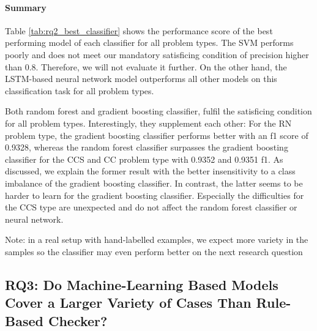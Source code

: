 \paragraph{Summary}

 Table \ref{tab:rq2_best_classifier} shows the performance score of the best performing model of each classifier for all problem types.
 The SVM performs poorly and does not meet our mandatory satisficing condition of precision higher than 0.8. Therefore, we will not evaluate it further. On the other hand, the LSTM-based neural network model outperforms all other models on this classification task for all problem types.

 Both random forest and gradient boosting classifier, fulfil the satisficing condition for all problem types. Interestingly, they supplement each other: For the RN problem type, the gradient boosting classifier performs better with an f1 score of 0.9328, whereas the random forest classifier surpasses the gradient boosting classifier for the CCS and CC problem type with 0.9352 and 0.9351 f1. As discussed, we explain the former result with the better insensitivity to a class imbalance of the gradient boosting classifier. In contrast, the latter seems to be harder to learn for the gradient boosting classifier. Especially the difficulties for the CCS type are unexpected and do not affect the random forest classifier or neural network.
 
 Note: in a real setup with hand-labelled examples, we expect more variety in the samples so the classifier may even perform better on the next research question 


 \subsection{RQ3: Do Machine-Learning Based Models Cover a Larger Variety of Cases Than Rule-Based Checker? }

